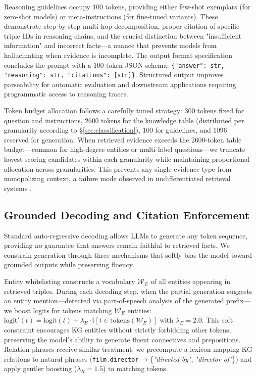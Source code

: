 \documentclass[conference]{IEEEtran}
\begin{document}
Reasoning guidelines occupy 100 tokens, providing either few-shot exemplars (for zero-shot models) or meta-instructions (for fine-tuned variants). These demonstrate step-by-step multi-hop decomposition, proper citation of specific triple IDs in reasoning chains, and the crucial distinction between "insufficient information" and incorrect facts—a nuance that prevents models from hallucinating when evidence is incomplete. The output format specification concludes the prompt with a 100-token JSON schema: \texttt{\{"answer": str, "reasoning": str, "citations": [str]\}}. Structured output improves parseability for automatic evaluation and downstream applications requiring programmatic access to reasoning traces.

Token budget allocation follows a carefully tuned strategy: 300 tokens fixed for question and instructions, 2600 tokens for the knowledge table (distributed per granularity according to §\ref{sec:classification}), 100 for guidelines, and 1096 reserved for generation. When retrieved evidence exceeds the 2600-token table budget—common for high-degree entities or multi-label questions—we truncate lowest-scoring candidates within each granularity while maintaining proportional allocation across granularities. This prevents any single evidence type from monopolizing context, a failure mode observed in undifferentiated retrieval systems \cite{shi2023replug,izacard2021leverage}.

\subsection{Grounded Decoding and Citation Enforcement}
\label{sec:decoding}

Standard auto-regressive decoding allows LLMs to generate any token sequence, providing no guarantee that answers remain faithful to retrieved facts. We constrain generation through three mechanisms that softly bias the model toward grounded outputs while preserving fluency.

Entity whitelisting constructs a vocabulary $\mathcal{W}_E$ of all entities appearing in retrieved triples. During each decoding step, when the partial generation suggests an entity mention—detected via part-of-speech analysis of the generated prefix—we boost logits for tokens matching $\mathcal{W}_E$ entities: $\text{logit}'(t) = \text{logit}(t) + \lambda_E \cdot \mathbb{I}[t \in \text{tokens}(\mathcal{W}_E)]$ with $\lambda_E=2.0$. This soft constraint encourages KG entities without strictly forbidding other tokens, preserving the model's ability to generate fluent connectives and prepositions. Relation phrases receive similar treatment: we precompute a lexicon mapping KG relations to natural phrases (\texttt{film.director} → \{\emph{"directed by"}, \emph{"director of"}\}) and apply gentler boosting ($\lambda_R=1.5$) to matching tokens.
\end{document}
